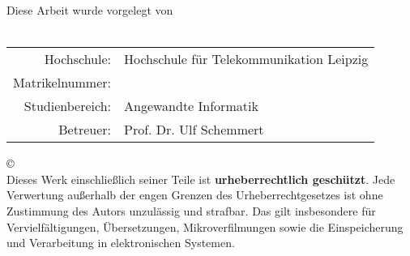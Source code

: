 \thispagestyle{plain}

\begin{titlepage}
	\begin{center}
		Diese Arbeit wurde vorgelegt von\\
		{\Large\footautor}\\[8ex]
		\begin{tabular}{rl}
			Hochschule: &\quad Hochschule für Telekommunikation Leipzig\\[1.2ex]
			Matrikelnummer: &\quad \matrikelnummer\\[1.2ex]
			Studienbereich: & \quad Angewandte Informatik\\[4ex]
			Betreuer: & \quad Prof. Dr. Ulf Schemmert\\[1.2ex]
		\end{tabular}
	
	
		\vspace*{\fill}
		\copyright\ \jahr\\[0.5ex]
		
		\singlespacing
		\small
		\noindent Dieses Werk einschließlich seiner Teile ist \textbf{urheberrechtlich geschützt}. Jede Verwertung außerhalb der engen Grenzen des Urheberrechtgesetzes ist ohne Zustimmung des Autors unzulässig und strafbar. Das gilt insbesondere für Vervielfältigungen, Übersetzungen, Mikroverfilmungen sowie die Einspeicherung und Verarbeitung in elektronischen Systemen.
	\end{center}
\end{titlepage}

